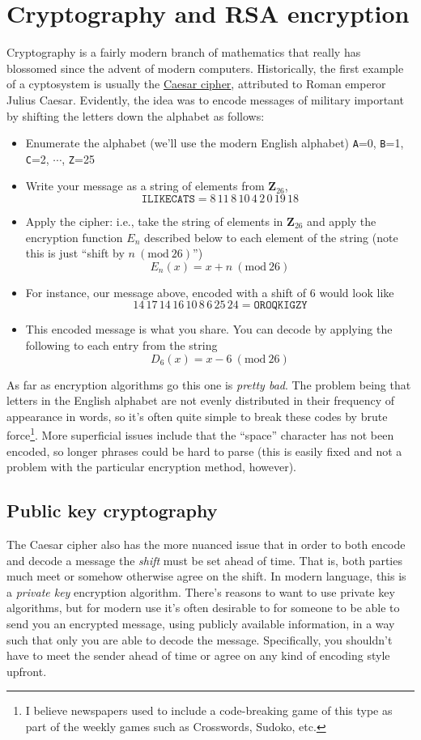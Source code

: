 \documentclass[12pt]{article}
\numberwithin{equation}{subsection}
\theoremstyle{note}
\newcommand{\Mod}[1]{\ (\mathrm{mod}\ #1)}
\begin{document}
\section{Cryptography and RSA encryption}
Cryptography is a fairly modern branch of mathematics that really has blossomed since the advent of modern computers. Historically, the first example of a cyptosystem is usually the \href{https://en.wikipedia.org/wiki/Caesar_cipher}{Caesar cipher}, attributed to Roman emperor Julius Caesar. Evidently, the idea was to encode messages of military important by shifting the letters down the alphabet as follows:
\begin{itemize}
	\item Enumerate the alphabet (we'll use the modern English alphabet) \texttt{A}=0, \texttt{B}=1, \texttt{C}=2, $\cdots$, \texttt{Z}=25
	\item Write your message as a string of elements from $\mathbf{Z}_{26}$, \[ \texttt{ILIKECATS}=8 \, 11\, 8 \,10\, 4\,2\, 0\, 19\, 18\]
	\item Apply the cipher: i.e., take the string of elements in $\mathbf{Z}_{26}$ and apply the encryption function $E_n$ described below to each element of the string (note this is just ``shift by $n\Mod{26}$'')\[E_n(x)=x+n\Mod{26}\]
	\item For instance, our message above, encoded with a shift of $6$ would look like \[ 14 \,17\, 14\, 16\, 10\, 8\, 6\, 25\, 24=\texttt{OROQKIGZY}\]
	\item This encoded message is what you share. You can decode by applying the following to each entry from the string \[ D_6(x)=x-6\Mod{26}\] 
	\end{itemize}
As far as encryption algorithms go this one is \textit{pretty bad}. The problem being that letters in the English alphabet are not evenly distributed in their frequency of appearance in words, so it's often quite simple to break these codes by brute force\footnote{I believe newspapers used to include a code-breaking game of this type as part of the weekly games such as Crosswords, Sudoko, etc.}. More superficial issues include that the ``space'' character has not been encoded, so longer phrases could be hard to parse (this is easily fixed and not a problem with the particular encryption method, however). 
	

	


\subsection{Public key cryptography}
The Caesar cipher also has the more nuanced issue that in order to both encode and decode a message the \textit{shift} must be set ahead of time. That is, both parties much meet or somehow otherwise agree on the shift. In modern language, this is a \textit{private key} encryption algorithm. There's reasons to want to use private key algorithms, but for modern use it's often desirable to for someone to be able to send you an encrypted message, using publicly available information, in a way such that only you are able to decode the message.  Specifically, you shouldn't have to meet the sender ahead of time or agree on any kind of encoding style upfront. 
\end{document}
